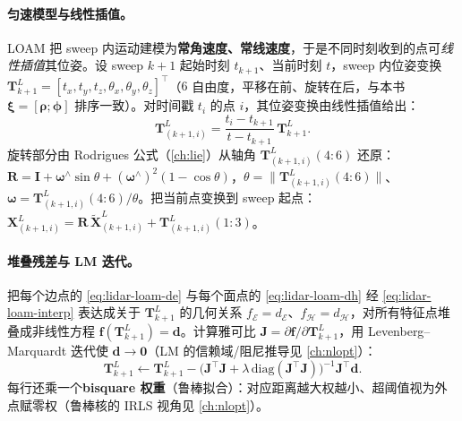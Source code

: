 \paragraph{匀速模型与线性插值。}
LOAM 把 sweep 内运动建模为\textbf{常角速度、常线速度}，于是不同时刻收到的点可\emph{线性插值}其位姿\cite{zhang2014loam}。设 sweep $k+1$ 起始时刻 $t_{k+1}$、当前时刻 $t$，sweep 内位姿变换 $\mathbf{T}^L_{k+1}=[t_x,t_y,t_z,\theta_x,\theta_y,\theta_z]^\top$（$6$ 自由度，平移在前、旋转在后，与本书 $\boldsymbol{\xi}=[\boldsymbol{\rho};\boldsymbol{\phi}]$ 排序一致）。对时间戳 $t_i$ 的点 $i$，其位姿变换由线性插值给出：
\begin{equation}
  \mathbf{T}^L_{(k+1,i)}=\frac{t_i-t_{k+1}}{t-t_{k+1}}\,\mathbf{T}^L_{k+1}.
  \label{eq:lidar-loam-interp}
\end{equation}
旋转部分由 Rodrigues 公式（\cref{ch:lie}）从轴角 $\mathbf{T}^L_{(k+1,i)}(4{:}6)$ 还原：$\mathbf{R}=\mathbf{I}+\boldsymbol{\omega}^\wedge\sin\theta+(\boldsymbol{\omega}^\wedge)^2(1-\cos\theta)$，$\theta=\|\mathbf{T}^L_{(k+1,i)}(4{:}6)\|$、$\boldsymbol{\omega}=\mathbf{T}^L_{(k+1,i)}(4{:}6)/\theta$。把当前点变换到 sweep 起点：$\mathbf{X}^L_{(k+1,i)}=\mathbf{R}\,\tilde{\mathbf{X}}^L_{(k+1,i)}+\mathbf{T}^L_{(k+1,i)}(1{:}3)$。

\paragraph{堆叠残差与 LM 迭代。}
把每个边点的 \cref{eq:lidar-loam-de} 与每个面点的 \cref{eq:lidar-loam-dh} 经 \cref{eq:lidar-loam-interp} 表达成关于 $\mathbf{T}^L_{k+1}$ 的几何关系 $f_{\mathcal{E}}=d_{\mathcal{E}}$、$f_{\mathcal{H}}=d_{\mathcal{H}}$，对所有特征点堆叠成非线性方程 $\mathbf{f}(\mathbf{T}^L_{k+1})=\mathbf{d}$。计算雅可比 $\mathbf{J}=\partial\mathbf{f}/\partial\mathbf{T}^L_{k+1}$，用 Levenberg–Marquardt 迭代使 $\mathbf{d}\to\mathbf{0}$（LM 的信赖域/阻尼推导见 \cref{ch:nlopt}）：
\begin{equation}
  \mathbf{T}^L_{k+1}\leftarrow\mathbf{T}^L_{k+1}-\big(\mathbf{J}^\top\mathbf{J}+\lambda\,\mathrm{diag}(\mathbf{J}^\top\mathbf{J})\big)^{-1}\mathbf{J}^\top\mathbf{d}.
  \label{eq:lidar-loam-lm}
\end{equation}
每行还乘一个\textbf{bisquare 权重}（鲁棒拟合）：对应距离越大权越小、超阈值视为外点赋零权（鲁棒核的 IRLS 视角见 \cref{ch:nlopt}）。

